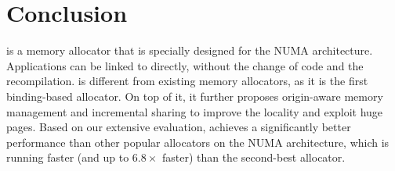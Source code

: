 \section{Conclusion}
\label{sec:conclusion}

\NM{} is a memory allocator that is specially designed for the NUMA architecture. Applications can be linked to \NM{} directly, without the change of code and the recompilation. \NM{} is different from existing memory allocators, as it is the first binding-based allocator. 
On top of it, it further proposes origin-aware memory management and incremental sharing to improve the locality and exploit huge pages. 
Based on our extensive evaluation, \NM{} achieves a significantly better performance than other popular allocators on the NUMA architecture, which is running  faster (and up to $6.8\times$ faster) than the second-best allocator.
